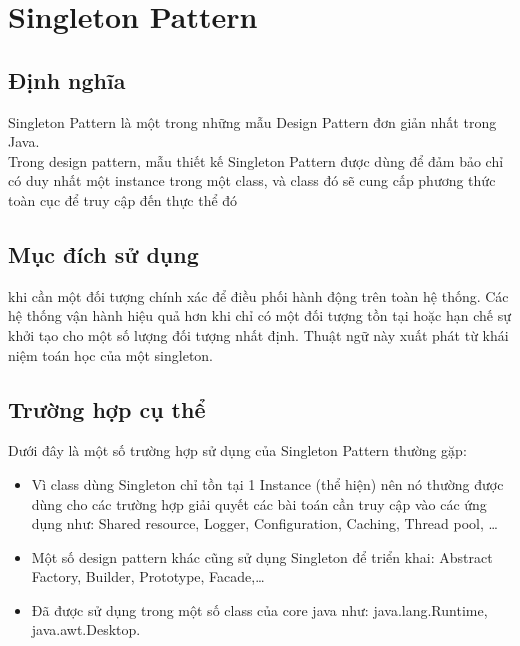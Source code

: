 \chapter{Singleton Pattern}

\section{Định nghĩa}
Singleton Pattern là một trong những mẫu Design Pattern đơn giản nhất trong Java.\\
Trong design pattern, mẫu thiết kế Singleton Pattern được dùng để đảm bảo chỉ có duy nhất một instance trong một class, và class đó sẽ cung cấp phương thức toàn cục để truy cập đến thực thể đó

\section{Mục đích sử dụng}
khi cần một đối tượng chính xác để điều phối hành động trên toàn hệ thống. Các hệ thống vận hành hiệu quả hơn khi chỉ có một đối tượng tồn tại hoặc hạn chế sự khởi tạo cho một số lượng đối tượng nhất định. Thuật ngữ này xuất phát từ khái niệm toán học của một singleton.

\section{Trường hợp cụ thể}
Dưới đây là một số trường hợp sử dụng của Singleton Pattern thường gặp:
\begin{itemize}
\item	Vì class dùng Singleton chỉ tồn tại 1 Instance (thể hiện) nên nó thường được dùng cho các trường hợp giải quyết các bài toán cần truy cập vào các ứng dụng như: Shared resource, Logger, Configuration, Caching, Thread pool, …\\
\item	Một số design pattern khác cũng sử dụng Singleton để triển khai: Abstract Factory, Builder, Prototype, Facade,…\\
\item	Đã được sử dụng trong một số class của core java như: java.lang.Runtime, java.awt.Desktop.
\end{itemize}
